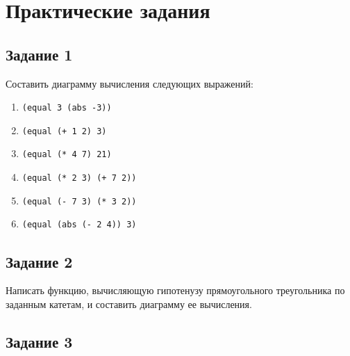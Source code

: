 \chapter{Практические задания}

\section{Задание 1}

Составить диаграмму вычисления следующих выражений:

\begin{enumerate}
	\item \texttt{(equal 3 (abs -3))}
	
	\item \texttt{(equal (+ 1 2) 3)}
	
	\item \texttt{(equal (* 4 7) 21)}
	
	\item \texttt{(equal (* 2 3) (+ 7 2))}
	
	\item \texttt{(equal (- 7 3) (* 3 2))}
	
	\item \texttt{(equal (abs (- 2 4)) 3)}
\end{enumerate}

\section{Задание 2}

Написать функцию, вычисляющую гипотенузу прямоугольного треугольника по заданным катетам, и составить диаграмму ее вычисления.



\section{Задание 3}

